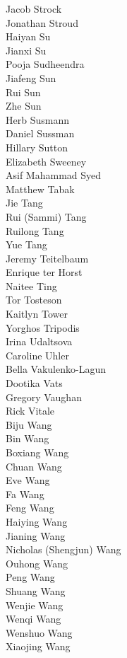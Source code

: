 Jacob Strock\\
Jonathan Stroud\\
Haiyan Su\\
Jianxi Su\\
Pooja Sudheendra\\
Jiafeng Sun\\
Rui Sun\\
Zhe Sun\\
Herb Susmann\\
Daniel Sussman\\
Hillary Sutton\\
Elizabeth Sweeney\\
Asif Mahammad Syed\\
Matthew Tabak\\
Jie Tang\\
Rui (Sammi) Tang\\
Ruilong Tang\\
Yue Tang\\
Jeremy Teitelbaum\\
Enrique ter Horst\\
Naitee Ting\\
Tor Tosteson\\
Kaitlyn Tower\\
Yorghos Tripodis\\
Irina Udaltsova\\
Caroline Uhler\\
Bella Vakulenko-Lagun\\
Dootika Vats\\
Gregory Vaughan\\
Rick Vitale\\
Biju Wang\\
Bin Wang\\
Boxiang Wang\\
Chuan Wang\\
Eve Wang\\
Fa Wang\\
Feng Wang\\
Haiying Wang\\
Jianing Wang\\
Nicholas (Shengjun) Wang\\
Ouhong Wang\\
Peng Wang\\
Shuang Wang\\
Wenjie Wang\\
Wenqi Wang\\
Wenshuo Wang\\
Xiaojing Wang\\
